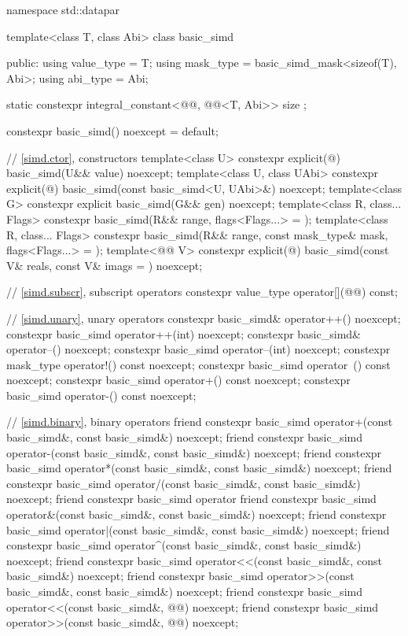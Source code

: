 \begin{codeblock}
namespace std::datapar {
  template<class T, class Abi> class basic_simd {
  public:
    using value_type = T;
    using mask_type = basic_simd_mask<sizeof(T), Abi>;
    using abi_type = Abi;

    static constexpr integral_constant<@@, @@<T, Abi>> size {};

    constexpr basic_simd() noexcept = default;

    // \ref{simd.ctor},  constructors
    template<class U> constexpr explicit(@\seebelow@) basic_simd(U&& value) noexcept;
    template<class U, class UAbi>
      constexpr explicit(@\seebelow@) basic_simd(const basic_simd<U, UAbi>&) noexcept;
    template<class G> constexpr explicit basic_simd(G&& gen) noexcept;
    template<class R, class... Flags>
      constexpr basic_simd(R&& range, flags<Flags...> = {});
    template<class R, class... Flags>
      constexpr basic_simd(R&& range, const mask_type& mask, flags<Flags...> = {});
    template<@@ V>
      constexpr explicit(@\seebelow@) basic_simd(const V& reals, const V& imags = {}) noexcept;

    // \ref{simd.subscr},  subscript operators
    constexpr value_type operator[](@@) const;

    // \ref{simd.unary},  unary operators
    constexpr basic_simd& operator++() noexcept;
    constexpr basic_simd operator++(int) noexcept;
    constexpr basic_simd& operator--() noexcept;
    constexpr basic_simd operator--(int) noexcept;
    constexpr mask_type operator!() const noexcept;
    constexpr basic_simd operator~() const noexcept;
    constexpr basic_simd operator+() const noexcept;
    constexpr basic_simd operator-() const noexcept;

    // \ref{simd.binary},  binary operators
    friend constexpr basic_simd operator+(const basic_simd&, const basic_simd&) noexcept;
    friend constexpr basic_simd operator-(const basic_simd&, const basic_simd&) noexcept;
    friend constexpr basic_simd operator*(const basic_simd&, const basic_simd&) noexcept;
    friend constexpr basic_simd operator/(const basic_simd&, const basic_simd&) noexcept;
    friend constexpr basic_simd operator%
    friend constexpr basic_simd operator&(const basic_simd&, const basic_simd&) noexcept;
    friend constexpr basic_simd operator|(const basic_simd&, const basic_simd&) noexcept;
    friend constexpr basic_simd operator^(const basic_simd&, const basic_simd&) noexcept;
    friend constexpr basic_simd operator<<(const basic_simd&, const basic_simd&) noexcept;
    friend constexpr basic_simd operator>>(const basic_simd&, const basic_simd&) noexcept;
    friend constexpr basic_simd operator<<(const basic_simd&, @@) noexcept;
    friend constexpr basic_simd operator>>(const basic_simd&, @@) noexcept;

}}
\end{codeblock}
